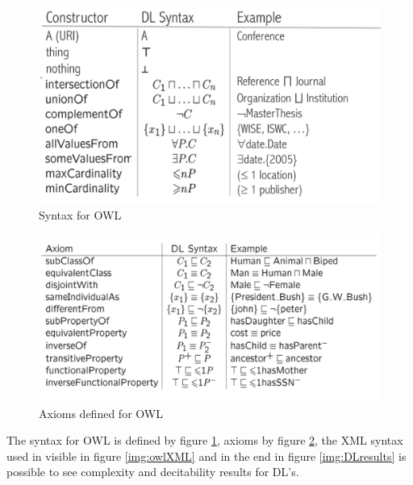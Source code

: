 \begin{figure}
	\includegraphics[width=\textwidth]{Images/owlSyntax}
	\caption{Syntax for OWL}
	\label{img:owlSyntax}
\end{figure}

\begin{figure}
	\includegraphics[width=\textwidth]{Images/owlAxioms}
	\caption{Axioms defined for OWL}
	\label{img:owlAxioms}
\end{figure}
The syntax for OWL is defined by figure \ref{img:owlSyntax}, axioms by figure 
\ref{img:owlAxioms}, the XML syntax used in visible in figure \ref{img:owlXML} and in the
end in figure \ref{img:DLresults} is possible to see complexity and decitability results
for DL's.

